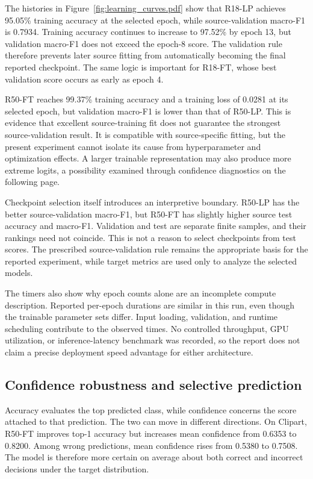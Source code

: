 \documentclass[10pt,a4paper]{article}
\begin{document}
The histories in Figure~\ref{fig:learning_curves.pdf} show that R18-LP achieves 95.05\% training accuracy at the selected epoch, while source-validation macro-F1 is 0.7934. Training accuracy continues to increase to 97.52\% by epoch 13, but validation macro-F1 does not exceed the epoch-8 score. The validation rule therefore prevents later source fitting from automatically becoming the final reported checkpoint. The same logic is important for R18-FT, whose best validation score occurs as early as epoch 4.

R50-FT reaches 99.37\% training accuracy and a training loss of 0.0281 at its selected epoch, but validation macro-F1 is lower than that of R50-LP. This is evidence that excellent source-training fit does not guarantee the strongest source-validation result. It is compatible with source-specific fitting, but the present experiment cannot isolate its cause from hyperparameter and optimization effects. A larger trainable representation may also produce more extreme logits, a possibility examined through confidence diagnostics on the following page.

Checkpoint selection itself introduces an interpretive boundary. R50-LP has the better source-validation macro-F1, but R50-FT has slightly higher source test accuracy and macro-F1. Validation and test are separate finite samples, and their rankings need not coincide. This is not a reason to select checkpoints from test scores. The prescribed source-validation rule remains the appropriate basis for the reported experiment, while target metrics are used only to analyze the selected models.

The timers also show why epoch counts alone are an incomplete compute description. Reported per-epoch durations are similar in this run, even though the trainable parameter sets differ. Input loading, validation, and runtime scheduling contribute to the observed times. No controlled throughput, GPU utilization, or inference-latency benchmark was recorded, so the report does not claim a precise deployment speed advantage for either architecture.


\subsection{Confidence robustness and selective prediction}
Accuracy evaluates the top predicted class, while confidence concerns the score attached to that prediction. The two can move in different directions. On Clipart, R50-FT improves top-1 accuracy but increases mean confidence from 0.6353 to 0.8200. Among wrong predictions, mean confidence rises from 0.5380 to 0.7508. The model is therefore more certain on average about both correct and incorrect decisions under the target distribution.
\end{document}
